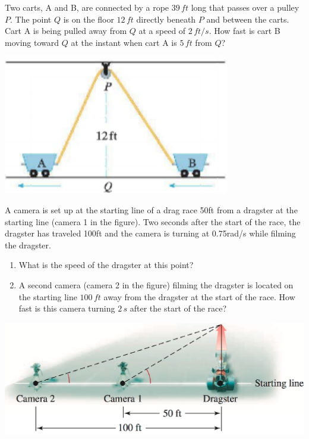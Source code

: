 \documentclass[../mathNotesPreamble]{subfiles}
\begin{document}
\noindent
\begin{minipage}[t]{0.7\linewidth}\mbox{}
  \begin{ex*}
  Two carts, A and B, are connected by a rope $39\,ft$ long that passes over a pulley $P$. The point $Q$ is on the floor $12\,ft$ directly beneath $P$ and between the carts.  Cart A is being pulled away from $Q$ at  a speed of $2\,ft/s$.  How fast is cart B moving toward $Q$ at the instant when cart A is $5\,ft$ from $Q$?
\end{ex*}
\end{minipage}%
\begin{minipage}[t]{0.3\linewidth}\mbox{}
  \begin{flushright}
    \vspace*{7.5pt}
    \includegraphics[width=0.9\linewidth]{../images/briggs_03_11/cart.png}
  \end{flushright}
\end{minipage}%
\pagebreak

\begin{ex*}
   A camera is set up at the starting line of a drag race 50ft from a dragster at the starting line (camera 1 in the figure). Two seconds after the start of the race, the dragster has traveled 100ft and the camera is turning at 0.75rad/s while filming the dragster.
  \begin{enumerate}[label=\alph*)]
    \item What is the speed of the dragster at this point?
    \item A second camera (camera 2 in the figure) filming the dragster is located on the starting line $100\,ft$ away from the dragster at the start of the race. How fast is this camera turning $2\,s$ after the start of the race?
  \end{enumerate}
\end{ex*}
\vspace*{-20pt}
\begin{flushright}
  \includegraphics[width=0.5\linewidth]{../images/briggs_03_11/dragrace.png}
\end{flushright}
\pagebreak
\end{document}
